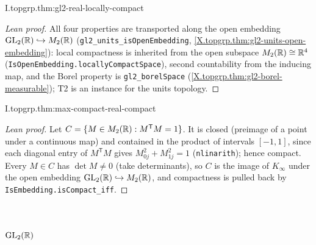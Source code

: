 \begin{theorem}
\end{theorem}
\begin{tfformal}{I.topgrp.thm:gl2-real-locally-compact}
\end{tfformal}
\begin{proof}[Lean proof]
All four properties are transported along the open embedding $\mathrm{GL}_2(\mathbb{R})\hookrightarrow M_2(\mathbb{R})$ (\texttt{gl2\_units\_isOpenEmbedding}, \cref{X.topgrp.thm:gl2-units-open-embedding}): local compactness is inherited from the open subspace $M_2(\mathbb{R})\cong\mathbb{R}^4$ (\texttt{IsOpenEmbedding.locallyCompactSpace}), second countability from the inducing map, and the Borel property is \texttt{gl2\_borelSpace} (\cref{X.topgrp.thm:gl2-borel-measurable}); T2 is an instance for the units topology.
\end{proof}

\begin{theorem}
\end{theorem}
\begin{tfformal}{I.topgrp.thm:max-compact-real-compact}
\end{tfformal}
\begin{proof}[Lean proof]
Let $C=\{M\in M_2(\mathbb{R}):M^{\mathsf T}M=1\}$. It is closed (preimage of a point under a continuous map) and contained in the product of intervals $[-1,1]$, since each diagonal entry of $M^{\mathsf T}M$ gives $M_{0j}^2+M_{1j}^2=1$ (\texttt{nlinarith}); hence compact. Every $M\in C$ has $\det M\neq0$ (take determinants), so $C$ is the image of $K_\infty$ under the open embedding $\mathrm{GL}_2(\mathbb{R})\hookrightarrow M_2(\mathbb{R})$, and compactness is pulled back by \texttt{IsEmbedding.isCompact\_iff}.
\end{proof}


\section{\texorpdfstring{$\mathrm{GL}_2(\mathbb{R})$}{GL₂(ℝ)}}

